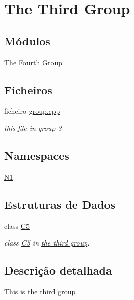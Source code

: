 \hypertarget{group__group3}{\section{The Third Group}
\label{group__group3}
}
\subsection*{Módulos}
\begin{DoxyCompactItemize}
\item 
\hyperlink{group__group4}{The Fourth Group}
\end{DoxyCompactItemize}
\subsection*{Ficheiros}
\begin{DoxyCompactItemize}
\item 
ficheiro \hyperlink{group_8cpp}{group.\-cpp}
\begin{DoxyCompactList}\small\item\em this file in group 3 \end{DoxyCompactList}\end{DoxyCompactItemize}
\subsection*{Namespaces}
\begin{DoxyCompactItemize}
\item 
\hyperlink{namespace_n1}{N1}
\end{DoxyCompactItemize}
\subsection*{Estruturas de Dados}
\begin{DoxyCompactItemize}
\item 
class \hyperlink{class_c5}{C5}
\begin{DoxyCompactList}\small\item\em class \hyperlink{class_c5}{C5} in \hyperlink{group__group3}{the third group}. \end{DoxyCompactList}\end{DoxyCompactItemize}


\subsection{Descrição detalhada}
This is the third group 
